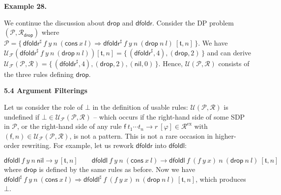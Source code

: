  
 
\par\medskip\noindent\textbf{Example 28.}\par
 
 
We continue the discussion about $\mathsf{drop}$ and $\mathsf{dfoldr}$. Consider the DP problem $(\mathcal{P},\mathcal{R}_{\mathsf{drop}})$ where $\mathcal{P}=\{\,{{{{{\mathsf{dfoldr}^{\sharp}}\ {f}}\ {y}}\ {n}}\ {({{\mathsf{cons}}\ {x}}\ {l})}}\Rightarrow{{{{{\mathsf{dfoldr}^{\sharp}}\ {f}}\ {y}}\ {n}}\ {({{\mathsf{drop}}\ {n}}\ {l})}}\ [\mathfrak{t},n]\,\}$. We have $\mathcal{U}_{\mathcal{F}}({{{{\mathsf{dfoldr}^{\sharp}}\ {f}}\ {y}}\ {n}}\ {({{\mathsf{drop}}\ {n}}\ {l})})[\mathfrak{t},n]=\{\,(\mathsf{dfoldr}^{\sharp},4),(\mathsf{drop},2)\,\}$ and can derive $\mathcal{U}_{\mathcal{F}}(\mathcal{P},\mathcal{R})=\{\,(\mathsf{dfoldr}^{\sharp},4),(\mathsf{drop},2),(\mathsf{nil},0)\,\}$. Hence, $\mathcal{U}(\mathcal{P},\mathcal{R})$ consists of the three rules defining $\mathsf{drop}$.\par
 
 
 
 
 
\par\medskip\noindent\textbf{5.4 Argument Filterings}\par
 
 
Let us consider the role of $\bot$ in the definition of usable rules: $\mathcal{U}(\mathcal{P},\mathcal{R})$ is undefined if $\bot\in\mathcal{U}_{\mathcal{F}}(\mathcal{P},\mathcal{R})$ – which occurs if the right-hand side of some SDP in $\mathcal{P}$, or the right-hand side of any rule ${{\mathsf{f}}\ {{t}_{1}\cdots{t}_{n}}}\rightarrow{r}\ [\varphi]\in\mathcal{R}^{\mathrm{ex}}$ with $(\mathsf{f},n)\in\mathcal{U}_{\mathcal{F}}(\mathcal{P},\mathcal{R})$, is not a pattern. This is not a rare occasion in higher-order rewriting. For example, let us rework $\mathsf{dfoldr}$ into $\mathsf{dfoldl}$:\par
    \[{{{{\mathsf{dfoldl}}\ {f}}\ {y}}\ {n}}\ {\mathsf{nil}}\rightarrow y\ [\mathfrak{t},n]\quad\quad{{{{\mathsf{dfoldl}}\ {f}}\ {y}}\ {n}}\ {({{\mathsf{cons}}\ {x}}\ {l})}\rightarrow{{{{\mathsf{dfoldl}}\ {f}}\ {({{f}\ {y}}\ {x})}}\ {n}}\ {({{\mathsf{drop}}\ {n}}\ {l})}\ [\mathfrak{t},n]\]    
where $\mathsf{drop}$ is defined by the same rules as before. Now we have ${{{{{\mathsf{dfoldl}^{\sharp}}\ {f}}\ {y}}\ {n}}\ {({{\mathsf{cons}}\ {x}}\ {l})}}\Rightarrow{{{{{\mathsf{dfoldl}^{\sharp}}\ {f}}\ {({{f}\ {y}}\ {x})}}\ {n}}\ {({{\mathsf{drop}}\ {n}}\ {l})}}\ [\mathfrak{t},n]$, which produces $\bot$.\par
 
